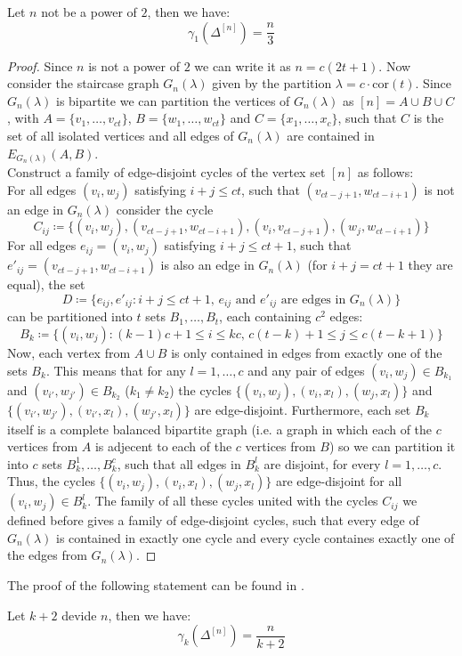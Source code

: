 \begin{thm}
Let $n$ not be a power of $2$, then we have:
\[
\gamma_1(\Delta^{[n]})=\frac{n}{3}
\] 
\begin{proof}
Since $n$ is not a power of $2$ we can write it as $n=c(2t+1)$. Now consider the staircase graph $G_n(\lambda)$ given by the partition $\lambda=c\cdot\text{cor}(t)$. Since $G_n(\lambda)$ is bipartite we can partition the vertices of $G_n(\lambda)$ as $[n]=A\cup B\cup C$, with $A=\{v_1,\ldots,v_{ct}\}$, $B=\{w_1,\ldots,w_{ct}\}$ and $C=\{x_1,\ldots,x_c\}$, such that $C$ is the set of all isolated vertices and all edges of $G_n(\lambda)$ are contained in $E_{G_n(\lambda)}(A,B)$.\\
Construct a family of edge-disjoint cycles of the vertex set $[n]$ as follows:\\
For all edges $(v_i,w_j)$ satisfying $i+j\leq ct$, such that $(v_{ct-j+1},w_{ct-i+1})$ is not an edge in $G_n(\lambda)$ consider the cycle
\[
C_{ij}\coloneqq\{(v_i,w_j),(v_{ct-j+1},w_{ct-i+1}),(v_i,v_{ct-j+1}),(w_j,w_{ct-i+1})\}
\]
For all edges $e_{ij}=(v_i,w_j)$ satisfying $i+j\leq ct+1$, such that $e'_{ij}=(v_{ct-j+1},w_{ct-i+1})$ is also an edge in $G_n(\lambda)$ (for $i+j=ct+1$ they are equal), the set
\[
D\coloneqq\{e_{ij}, e'_{ij}:i+j\leq ct+1\text{, }e_{ij}\text{ and }e'_{ij}\text{ are edges in }G_n(\lambda)\}
\] can be partitioned into $t$ sets $B_1,\ldots,B_t$, each containing $c^2$ edges:
\[
B_k\coloneqq\{(v_i,w_j):(k-1)c+1\leq i\leq kc\text{, }c(t-k)+1\leq j\leq c(t-k+1)\}
\]
Now, each vertex from $A\cup B$ is only contained in edges from exactly one of the sets $B_k$. This means that for any $l=1,\ldots,c$ and any pair of edges $(v_i,w_j)\in B_{k_1}$ and $(v_{i'},w_{j'})\in B_{k_2}$ ($k_1\neq k_2$) the cycles $\{(v_i,w_j),(v_i,x_l),(w_j,x_l)\}$ and $\{(v_{i'},w_{j'}),(v_{i'},x_l),(w_{j'},x_l)\}$ are edge-disjoint. Furthermore, each set $B_k$ itself is a complete balanced bipartite graph (i.e. a graph in which each of the $c$ vertices from $A$ is adjecent to each of the $c$ vertices from $B$) so we can partition it into $c$ sets $B_k^1,\ldots,B_k^c$, such that all edges in $B_k^l$ are disjoint, for every $l=1,\ldots,c$. Thus, the cycles $\{(v_i,w_j),(v_i,x_l),(w_j,x_l)\}$ are edge-disjoint for all $(v_i,w_j)\in B_k^l$. The family of all these cycles united with the cycles $C_{ij}$ we defined before gives a family of edge-disjoint cycles, such that every edge of $G_n(\lambda)$ is contained in exactly one cycle and every cycle containes exactly one of the edges from $G_n(\lambda)$.
\end{proof}
\end{thm}

The proof of the following statement can be found in \cite{6}.

\begin{thm}
Let $k+2$ devide $n$, then we have:
\[
\gamma_k(\Delta^{[n]})=\frac{n}{k+2}
\]
\end{thm}
